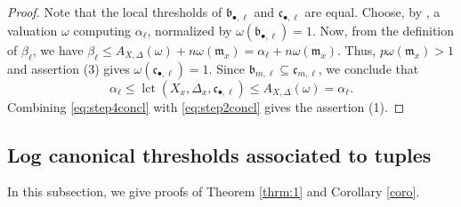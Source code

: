 \documentclass[a4paper,12pt]{amsart}
\theoremstyle{plain}
\theoremstyle{definition}
\numberwithin{equation}{section}
\def\lct{\operatorname{lct}}
\begin{document}
\begin{proof}
Note that the local thresholds of $\mathfrak{b}_{\bullet,\ell}$ and $\mathfrak{c}_{\bullet,\ell}$ are equal. Choose, by \cite[Theorem 1.1]{Xu20}, a valuation $\omega$ computing $\alpha_{\ell}$, normalized by $\omega(\mathfrak{b}_{\bullet,\ell})=1$.  Now, from the definition of $\beta_{\ell}$, we have $\beta_{\ell}\leq A_{X,\Delta}(\omega)+n\omega(\mathfrak{m}_x)=\alpha_{\ell}+n\omega(\mathfrak{m}_x)$. Thus, $p\omega(\mathfrak{m}_x)>1$ and assertion (3) gives $\omega(\mathfrak{c}_{\bullet,\ell})=1$. Since $\mathfrak{b}_{m,\ell}\subseteq \mathfrak{c}_{m,\ell}$, we conclude that
\begin{equation}\label{eq:step4concl}
    \alpha_{\ell}\leq \lct(X_x,\Delta_x,\mathfrak{c}_{\bullet,\ell})\leq A_{X,\Delta}(\omega)=\alpha_{\ell}.
\end{equation}
Combining \eqref{eq:step4concl} with \eqref{eq:step2concl} gives the assertion (1).
\end{proof}

\subsection{Log canonical thresholds associated to tuples}

In this subsection, we give proofs of Theorem \ref{thrm:1} and Corollary \ref{coro}.
\end{document}

